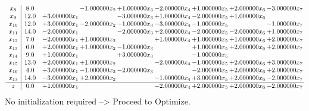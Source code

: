 \documentclass[10pt]{article}
\begin{document}
\[\begin{array}{c| c c@{\hskip 2pt} c@{\hskip 2pt} c@{\hskip 2pt} c@{\hskip 2pt} c@{\hskip 2pt} c@{\hskip 2pt} c@{\hskip 2pt} }
 x_{8}   &  8.0  &   & -1.000000 x_{2} & + 1.000000 x_{3} & -2.000000 x_{4} & + 1.000000 x_{5} & + 2.000000 x_{6} & -3.000000 x_{7}\\
 x_{9}   &  12.0 & + 3.000000 x_{1} &   & -3.000000 x_{3} & + 1.000000 x_{4} & -2.000000 x_{5} & + 1.000000 x_{6} &   \\
 x_{10}   &  12.0 & + 3.000000 x_{1} & -2.000000 x_{2} & -1.000000 x_{3} & -3.000000 x_{4} & -1.000000 x_{5} &   & -1.000000 x_{7}\\
 x_{11}   &  14.0 & -2.000000 x_{1} &   & -2.000000 x_{3} & + 2.000000 x_{4} & -2.000000 x_{5} & -2.000000 x_{6} & + 1.000000 x_{7}\\
 x_{12}   &  7.0 & -2.000000 x_{1} & + 1.000000 x_{2} &   & + 1.000000 x_{4} & + 1.000000 x_{5} & + 1.000000 x_{6} & + 2.000000 x_{7}\\
 x_{13}   &  6.0 & + 2.000000 x_{1} & + 1.000000 x_{2} & -1.000000 x_{3} &   & + 1.000000 x_{5} & + 2.000000 x_{6} & + 2.000000 x_{7}\\
 x_{14}   &  9.0 & + 1.000000 x_{1} &   & + 3.000000 x_{3} &   & -1.000000 x_{5} &    &   \\
 x_{15}   &  13.0 & + 2.000000 x_{1} & + 1.000000 x_{2} &   & -2.000000 x_{4} & -1.000000 x_{5} & + 2.000000 x_{6} & + 3.000000 x_{7}\\
 x_{16}   &  4.0 & + 3.000000 x_{1} & -1.000000 x_{2} & -2.000000 x_{3} &   & -2.000000 x_{5} & + 2.000000 x_{6} & + 2.000000 x_{7}\\
 x_{17}   &  14.0 & -3.000000 x_{1} & + 2.000000 x_{2} &   & -1.000000 x_{4} & + 3.000000 x_{5} & + 2.000000 x_{6} & -2.000000 x_{7}\\
\hline
z    &  0.0 & + 1.000000 x_{1} &    &   & -2.000000 x_{4} & + 2.000000 x_{5} & + 2.000000 x_{6} & -2.000000 x_{7}\\
\end{array}\]
No initialization required --> Proceed to Optimize. 
\end{document}
